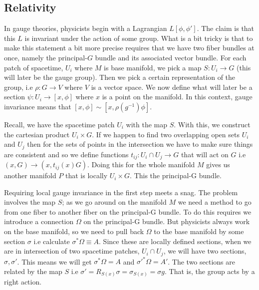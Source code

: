\documentclass{article}
\theoremstyle{definition}
\begin{document}
    
\subsection{Relativity}

    In gauge theories, physicists begin with a Lagrangian $L[\phi, \phi']$. The claim is that this $L$ is invariant under the action of some group. What is a bit tricky is that to make this statement a bit more precise requires that we have two fiber bundles at once, namely the principal-$G$ bundle and its associated vector bundle. For each patch of spacetime, $U_i$ where $M$ is base manifold, we pick a map $S:U_i \rightarrow G$ (this will later be the gauge group). Then we pick a certain representation of the group, i.e $\rho :G \rightarrow V$ where $V$ is a vector space. We now define what will later be a section $\psi : U_i \rightarrow[x,\phi]$ where $x$ is a point on the manifold. In this context, gauge invariance means that $[x,\phi] \sim [x,\rho (g^{-1})\phi]$. 
    
    Recall, we have the spacetime patch $U_i$ with the map $S$. With this, we construct the cartesian product $U_i \times G$. If we happen to find two overlapping open sets $U_i$ and $U_j$ then for the sets of points in the intersection we have to make sure things are consistent and so we define functions $t_{ij} : U_i \cap U_j \rightarrow G$ that will act on $G$ i.e $(x,G) \rightarrow (x, t_{ij}(x)G)$. Doing this for the whole manifold $M$ gives us another manifold $P$ that is locally $U_i \times G$. This the principal-G bundle.
    
    Requiring local gauge invariance in the first step meets a snag. The problem involves the map $S$; as we go around on the manifold $M$ we need a method to go from one fiber to another fiber on the principal-G bundle. To do this requires we introduce a connection $\Omega$ on the principal-G bundle. But physicists always work on the base manifold, so we need to pull back $\Omega$ to the base manifold by some section $\sigma$ i.e calculate $\sigma^*\Omega \equiv A$. Since these are locally defined sections, when we are in intersection of two spacetime patches, $U_i \cap U_j$, we will have two sections, $\sigma,\sigma'$. This means we will get $\sigma^*\Omega=A$ and $\sigma'^*\Omega=A'$. The two sections are related by the map $S$ i.e $\sigma'=R_{S(x)}\sigma=\sigma_{S(x)}=\sigma g$. That is, the group acts by a right action.
    
\end{document}
